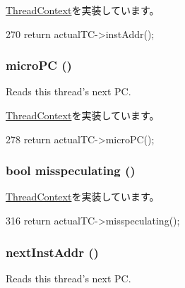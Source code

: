 \hyperlink{classThreadContext_a899644592f5027a7951cfd87b1c548a2}{ThreadContext}を実装しています。


\begin{DoxyCode}
270     { return actualTC->instAddr(); }
\end{DoxyCode}
\hypertarget{classCheckerThreadContext_a1a21696f33a7d38f251687ae0b5e9718}{
\subsubsection[{microPC}]{ microPC ()}}
\label{classCheckerThreadContext_a1a21696f33a7d38f251687ae0b5e9718}
Reads this thread's next PC. 

\hyperlink{classThreadContext_a263dbcf93ece0a30ea54a77fdb2e3926}{ThreadContext}を実装しています。


\begin{DoxyCode}
278     { return actualTC->microPC(); }
\end{DoxyCode}
\hypertarget{classCheckerThreadContext_a99768639c728ee835cce54b8b42b3d8f}{
\subsubsection[{misspeculating}]{\setlength{\rightskip}{0pt plus 5cm}bool misspeculating ()}}
\label{classCheckerThreadContext_a99768639c728ee835cce54b8b42b3d8f}


\hyperlink{classThreadContext_a6b21c2b589ae3065643986e1c3e5f6fa}{ThreadContext}を実装しています。


\begin{DoxyCode}
316 { return actualTC->misspeculating(); }
\end{DoxyCode}
\hypertarget{classCheckerThreadContext_aceec6e28772f91b3cc921c0e3927b0c2}{
\subsubsection[{nextInstAddr}]{ nextInstAddr ()}}
\label{classCheckerThreadContext_aceec6e28772f91b3cc921c0e3927b0c2}
Reads this thread's next PC. 

